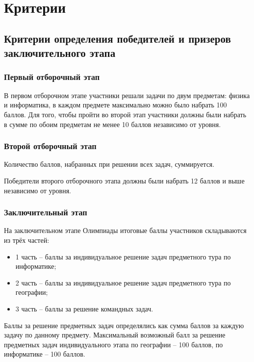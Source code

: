 \part{Критерии}
\chapter{Критерии определения победителей и призеров заключительного этапа}

\section{Первый отборочный этап}
 
В первом отборочном этапе участники решали задачи по двум предметам: физика и информатика, в каждом предмете максимально можно было набрать 100 баллов. Для того, чтобы пройти во второй этап участники  должны были набрать в сумме по обоим предметам не менее 10 баллов независимо от уровня.

\section{Второй отборочный этап}

Количество баллов, набранных при решении всех задач, суммируется.

Победители второго отборочного этапа должны были набрать 12 баллов и выше независимо от уровня.

\section{Заключительный этап}

На заключительном этапе Олимпиады итоговые баллы участников складываются из трёх частей:
\begin{itemize}
    \item 1 часть – баллы за индивидуальное решение задач предметного тура по информатике;
    \item 2 часть – баллы за индивидуальное решение задач предметного тура по географии;
    \item 3 часть – баллы за решение командных задач.
\end{itemize}

Баллы за решение предметных задач определялись как сумма баллов за каждую задачу по данному предмету. Максимальный возможный балл за решение предметных задач индивидуального этапа по географии – 100 баллов, по информатике – 100 баллов.

